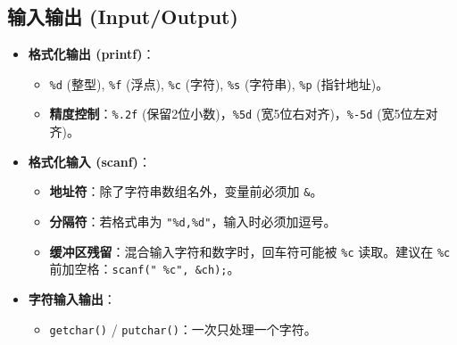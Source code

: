 \documentclass[a4paper,12pt]{article}
\begin{document}
\subsection{输入输出 (Input/Output)}
\begin{itemize}
    \item \textbf{格式化输出 (printf)}：
    \begin{itemize}
        \item \texttt{\%d} (整型), \texttt{\%f} (浮点), \texttt{\%c} (字符), \texttt{\%s} (字符串), \texttt{\%p} (指针地址)。
        \item \textbf{精度控制}：\texttt{\%.2f} (保留2位小数)，\texttt{\%5d} (宽5位右对齐)，\texttt{\%-5d} (宽5位左对齐)。
    \end{itemize}
    \item \textbf{格式化输入 (scanf)}：
    \begin{itemize}
        \item \textbf{地址符}：除了字符串数组名外，变量前必须加 \texttt{\&}。
        \item \textbf{分隔符}：若格式串为 \texttt{"\%d,\%d"}，输入时必须加逗号。
        \item \textbf{缓冲区残留}：混合输入字符和数字时，回车符可能被 \texttt{\%c} 读取。建议在 \texttt{\%c} 前加空格：\texttt{scanf(" \%c", \&ch);}。
    \end{itemize}
    \item \textbf{字符输入输出}：
    \begin{itemize}
        \item \texttt{getchar()} / \texttt{putchar()}：一次只处理一个字符。
    \end{itemize}
\end{itemize}
\end{document}
